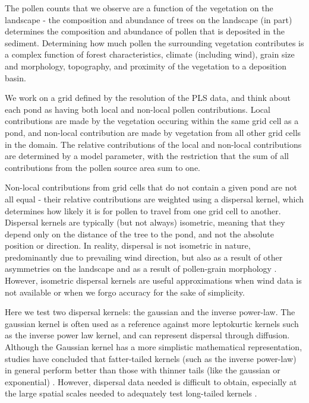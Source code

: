 \documentclass[12pt]{article}
\begin{document}
The pollen counts that we observe are a function of the vegetation on
the landscape - the composition and abundance of trees on the
landscape (in part) determines the composition and abundance of pollen
that is deposited in the sediment. Determining how much pollen the
surrounding vegetation contributes is a complex function of forest
characteristics, climate (including wind), grain size and morphology,
topography, and proximity of the vegetation to a deposition basin.

We work on a grid defined by the resolution of the PLS data, and think
about each pond as having both local and non-local pollen
contributions. Local contributions are made by the vegetation occuring
within the same grid cell as a pond, and non-local contribution are
made by vegetation from all other grid cells in the domain. The
relative contributions of the local and non-local contributions are
determined by a model parameter, with the restriction that the sum of
all contributions from the pollen source area sum to one.

Non-local contributions from grid cells that do not contain a given
pond are not all equal - their relative contributions are weighted
using a dispersal kernel, which determines how likely it is for pollen
to travel from one grid cell to another. Dispersal kernels are
typically (but not always) isometric, meaning that they depend only on
the distance of the tree to the pond, and not the absolute position or
direction. In reality, dispersal is not isometric in nature,
predominantly due to prevailing wind direction, but also as a result
of other asymmetries on the landscape and as a result of pollen-grain
morphology \cite{XXX}. However, isometric dispersal kernels are useful
approximations when wind data is not available or when we forgo
accuracy for the sake of simplicity.

Here we test two dispersal kernels: the gaussian and the inverse
power-law. The gaussian kernel is often used as a reference against
more leptokurtic kernels such as the inverse power law kernel, and can
represent dispersal through diffusion. Although the Gaussian kernel
has a more simplistic mathematical representation, studies have
concluded that fatter-tailed kernels (such as the inverse power-law)
in general perform better than those with thinner tails (like the
gaussian or exponential) \cite{XXX}. However, dispersal data needed is
difficult to obtain, especially at the large spatial scales needed to
adequately test long-tailed kernels \cite{XXX}. 
\end{document}
